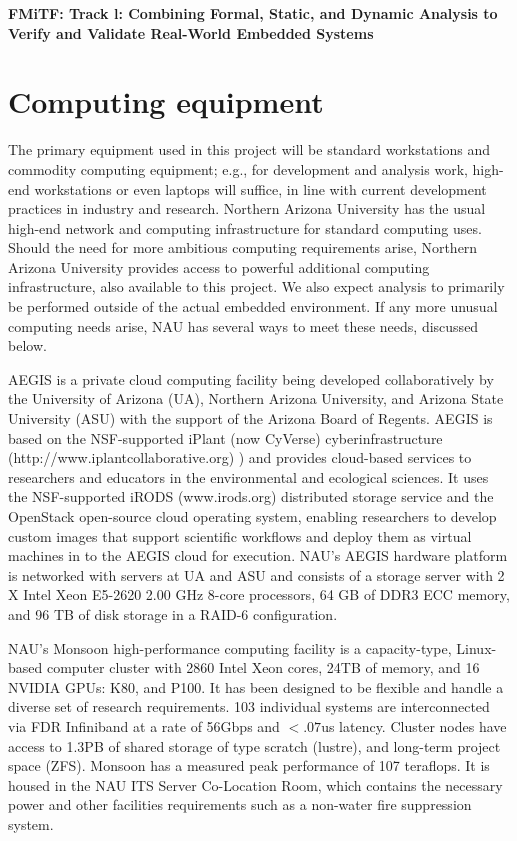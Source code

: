 \documentclass[12pt]{article}
\begin{document}
\begin{center}
{\Large\sf\textbf{FMiTF: Track l: Combining Formal, Static, and
  Dynamic Analysis to Verify and Validate Real-World Embedded Systems}}
\end{center}

\section*{Computing equipment}

The primary equipment used in this project will be standard workstations and commodity computing equipment; e.g., for development and analysis work, high-end workstations or even laptops will suffice, in line with current development practices in industry and research. Northern Arizona University has the usual high-end network and computing infrastructure for standard computing uses.  Should the need for more ambitious computing requirements arise, Northern Arizona University provides access to powerful additional computing infrastructure, also available to this project.  We also expect analysis to primarily be performed outside of the actual embedded environment.  If any more unusual computing needs arise, NAU has several ways to meet these needs, discussed below.

AEGIS is a private cloud computing facility being developed collaboratively by the University of Arizona (UA), Northern Arizona University, and Arizona State University (ASU) with the support of the Arizona Board of Regents. AEGIS is based on the NSF-supported iPlant (now CyVerse) cyberinfrastructure (http://www.iplantcollaborative.org) ) and provides cloud-based services to researchers and educators in the environmental and ecological sciences. It uses the NSF-supported iRODS (www.irods.org) distributed storage service and the OpenStack open-source cloud operating system, enabling researchers to develop custom images that support scientific workflows and deploy them as virtual machines in to the AEGIS cloud for execution. NAU’s AEGIS hardware platform is networked with servers at UA and ASU and consists of a storage server with 2 X Intel Xeon E5-2620 2.00 GHz 8-core processors, 64 GB of DDR3 ECC memory, and 96 TB of disk storage in a RAID-6 configuration.

NAU’s Monsoon high-performance computing facility is a capacity-type, Linux-based computer cluster with 2860 Intel Xeon cores, 24TB of memory, and 16 NVIDIA GPUs: K80, and P100. It has been designed to be flexible and handle a diverse set of research requirements. 103 individual systems are interconnected via FDR Infiniband at a rate of 56Gbps and $<.07$us latency. Cluster nodes have access to 1.3PB of shared storage of type scratch (lustre), and long-term project space (ZFS). Monsoon has a measured peak performance of 107 teraflops. It is housed in the NAU ITS Server Co-Location Room, which contains the necessary power and other facilities requirements such as a non-water fire suppression system.
\end{document}
